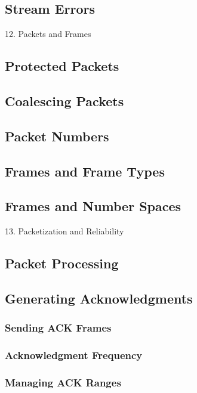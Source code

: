 \documentclass{article}
\begin{document}
\subsection{Stream Errors}

12. Packets and Frames

\subsection{Protected Packets}

\subsection{Coalescing Packets}

\subsection{Packet Numbers}

\subsection{Frames and Frame Types}

\subsection{Frames and Number Spaces}

13. Packetization and Reliability

\subsection{Packet Processing}

\subsection{Generating Acknowledgments}

\subsubsection{Sending ACK Frames}

\subsubsection{Acknowledgment Frequency}

\subsubsection{Managing ACK Ranges}
\end{document}
